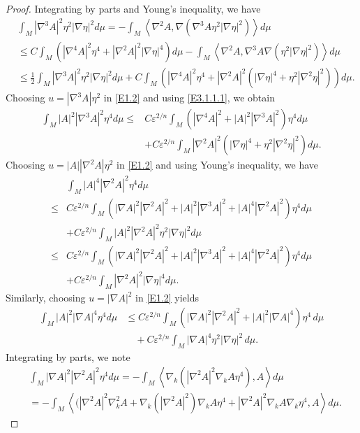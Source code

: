 \documentclass{amsart}
\theoremstyle{definition}
\numberwithin{equation}{section}
\begin{document}
\begin{proof}
Integrating by parts and Young's inequality, we have
\begin{align}\label{E3.1.1.1}
  & \int_{M}  |\nabla^{3} A|^2   \eta^2 |\nabla \eta|^2   d\mu = - \int_{M}  \left <\nabla^{2} A, \nabla (\nabla^{3} A    \eta^2 |\nabla
  \eta|^2 )\right >  d\mu\\
  &\leq C \int_{M}    (|\nabla^{4} A|^2    \eta^4 +|\nabla^{2} A|^2 |\nabla \eta|^4 )   d\mu- \int_{M}  \left <\nabla^{2} A, \nabla^{3} A
  \nabla (  \eta^2 |\nabla \eta|^2 )\right >  d\mu\nonumber\\
  &\leq \frac 12 \int_{M}  |\nabla^{3} A|^2   \eta^2 |\nabla \eta|^2   d\mu+C \int_{M}  (|\nabla^{4} A|^2    \eta^4+  |\nabla^{2} A|^2
  (|\nabla \eta|^4+\eta^2|\nabla^2\eta|^2 ) ) d\mu \nonumber.
 \end{align}
Choosing $u=|\nabla^3A| \eta^2$ in \eqref{E1.2}  and using \eqref{E3.1.1.1}, we obtain
\begin{align}\label{E3.1.1}
  \int_{M} |A|^2 |\nabla^{3} A|^2   \eta^4   d\mu \leq &C\varepsilon^{2/n} \int_{M} ( |\nabla^{4} A|^2+|A|^2 |\nabla^3A|^2 ) \eta^4   d\mu\\
  &+ C\varepsilon^{2/n} \int_{M}   |\nabla^{2} A|^2 (|\nabla \eta|^4+\eta^2|\nabla^2\eta|^2 )   d\mu \nonumber.
 \end{align}
 Choosing $u=|A||\nabla^2A| \eta^2$ in \eqref{E1.2} and using Young's inequality, we have
\begin{align}\label{E3.1.1}
  &\int_{M} |A|^4 |\nabla^{2} A|^2   \eta^4   d\mu\\
   \leq &C\varepsilon^{2/n} \int_{M} (|\nabla A|^2 |\nabla^{2} A|^2+|A|^2 |\nabla^3A|^2+ |A|^4
  |\nabla^{2} A|^2 ) \eta^4   d\mu \nonumber\\
  &+ C\varepsilon^{2/n} \int_{M}   |A|^2 |\nabla^{2} A|^2 \eta^2 |\nabla \eta|^2 d\mu \nonumber\\
  \leq &C\varepsilon^{2/n} \int_{M} (|\nabla A|^2 |\nabla^{2} A|^2+|A|^2 |\nabla^3A|^2+ |A|^4
  |\nabla^{2} A|^2 ) \eta^4   d\mu\nonumber\\
  & +  C\varepsilon^{2/n} \int_{M}   |\nabla^{2} A|^2 |\nabla \eta|^4    d\mu \nonumber.
 \end{align}
Similarly,  choosing $u=| \nabla A|^2 $ in \eqref{E1.2}  yields
\begin{align}\label{E3.1.1.2}
  \int_{M} |A|^2 |\nabla  A|^4   \eta^4   d\mu & \leq C\varepsilon^{2/n} \int_{M} (  |\nabla  A|^2 |\nabla^2  A|^2 + |A|^2   |\nabla  A|^4 )  \eta^4\,d\mu
  \\
   &\quad +C\varepsilon^{2/n} \int_{M}   |\nabla  A|^4     \eta^2|\nabla \eta|^2\, d\mu\nonumber.
\end{align}
Integrating by parts, we note
\begin{align}\label{E3.1.2}
       & \int_{M} |\nabla A|^2 |\nabla^2 A |^2 \eta^4  d\mu =-\int_{M} \left <  \nabla_k (|\nabla^2 A|^2\nabla_k A \eta^4),  A\right >  d\mu\\
       &=-\int_{M} \left <  (|\nabla^2 A|^2\nabla_k^2 A+  \nabla_k (  |\nabla^2 A|^2) \nabla_k A  \eta^4 +|\nabla^2 A|^2\nabla_k A \nabla_k \eta^4 ,
       A\right >  d\mu.  \nonumber
\end{align}




\end{proof}
\end{document}
